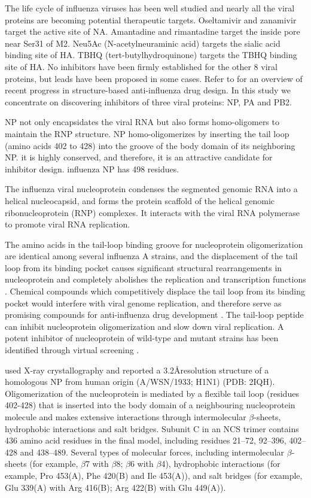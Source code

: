 The life cycle of influenza viruses has been well studied and nearly all the viral proteins are becoming potential therapeutic targets. Oseltamivir and zanamivir target the active site of NA. Amantadine and rimantadine target the inside pore near Ser31 of M2. Neu5Ac (N-acetylneuraminic acid) targets the sialic acid binding site of HA. TBHQ (tert-butylhydroquinone) targets the TBHQ binding site of HA. No inhibitors have been firmly established for the other 8 viral proteins, but leads have been proposed in some cases. Refer to \citep{1229} for an overview of recent progress in structure-based anti-influenza drug design. In this study we concentrate on discovering inhibitors of three viral proteins: NP, PA and PB2.

NP not only encapsidates the viral RNA but also forms homo-oligomers to maintain the RNP structure. NP homo-oligomerizes by inserting the tail loop (amino acids 402 to 428) into the groove of the body domain of its neighboring NP. it is highly conserved, and therefore, it is an attractive candidate for inhibitor design. influenza NP has 498 residues.

The influenza viral nucleoprotein condenses the segmented genomic RNA into a helical nucleocapsid, and forms the protein scaffold of the helical genomic ribonucleoprotein (RNP) complexes. It interacts with the viral RNA polymerase to promote viral RNA replication.

The amino acids in the tail-loop binding groove for nucleoprotein oligomerization are identical among several influenza A strains, and the displacement of the tail loop from its binding pocket causes significant structural rearrangements in nucleoprotein and completely abolishes the replication and transcription functions \citep{1231}. Chemical compounds which competitively displace the tail loop from its binding pocket would interfere with viral genome replication, and therefore serve as promising compounds for anti-influenza drug development \citep{1140,1231,1232}. The tail-loop peptide can inhibit nucleoprotein oligomerization and slow down viral replication. A potent inhibitor of nucleoprotein of wild-type and mutant strains has been identified through virtual screening \citep{1233}.

\citep{1140} used X-ray crystallography and reported a 3.2\AA resolution structure of a homologous NP from human origin (A/WSN/1933; H1N1) (PDB: 2IQH). Oligomerization of the nucleoprotein is mediated by a flexible tail loop (residues 402-428) that is inserted into the body domain of a neighbouring nucleoprotein molecule and makes extensive interactions through intermolecular $\beta$-sheets, hydrophobic interactions and salt bridges. Subunit C in an NCS trimer contains 436 amino acid residues in the final model, including residues 21–72, 92–396, 402–428 and 438–489. Several types of molecular forces, including intermolecular $\beta$-sheets (for example, $\beta$7 with $\beta$8; $\beta$6 with $\beta$4), hydrophobic interactions (for example, Pro 453(A), Phe 420(B) and Ile 453(A)), and salt bridges (for example, Glu 339(A) with Arg 416(B); Arg 422(B) with Glu 449(A)).

